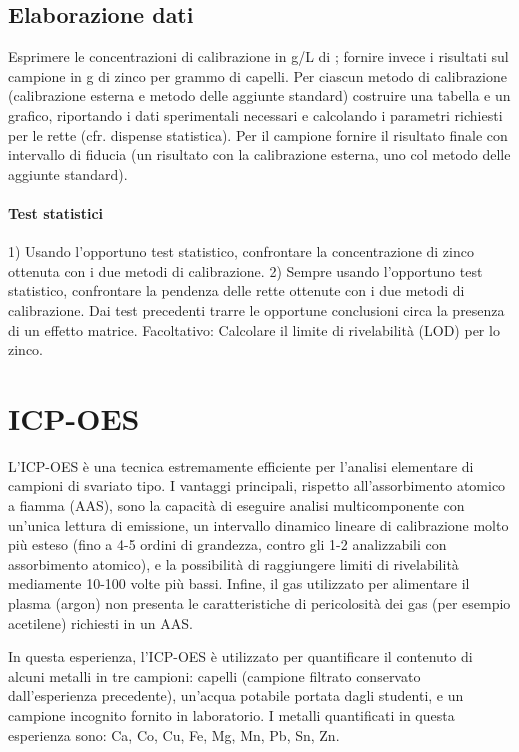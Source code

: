 \subsection{Elaborazione dati}
Esprimere le concentrazioni di calibrazione in \mu g/L di ; fornire invece i risultati sul campione in \mu g di zinco per grammo di capelli. Per ciascun metodo di calibrazione (calibrazione esterna e metodo delle aggiunte standard) costruire una tabella e un grafico, riportando i dati sperimentali necessari e calcolando i parametri richiesti per le rette (cfr. dispense statistica). Per il campione fornire il risultato finale con intervallo di fiducia (un risultato con la calibrazione esterna, uno col metodo delle aggiunte standard).

\paragraph{Test statistici}
1) Usando l'opportuno test statistico, confrontare la concentrazione di zinco ottenuta con i due metodi di calibrazione. 2) Sempre usando l'opportuno test statistico, confrontare la pendenza delle rette ottenute con i due metodi di calibrazione. Dai test precedenti trarre le opportune conclusioni circa la presenza di un effetto matrice.
Facoltativo: Calcolare il limite di rivelabilità (LOD) per lo zinco.

\section{ICP-OES}

L'ICP-OES è una tecnica estremamente efficiente per l'analisi elementare di campioni di svariato tipo. I vantaggi principali, rispetto all'assorbimento atomico a fiamma (AAS), sono la capacità di eseguire analisi multicomponente con un'unica lettura di emissione, un intervallo dinamico lineare di calibrazione molto più esteso (fino a 4-5 ordini di grandezza, contro gli 1-2 analizzabili con assorbimento atomico), e la possibilità di raggiungere limiti di rivelabilità mediamente 10-100 volte più bassi. Infine, il gas utilizzato per alimentare il plasma (argon) non presenta le caratteristiche di pericolosità dei gas (per esempio acetilene) richiesti in un AAS.

In questa esperienza, l'ICP-OES è utilizzato per quantificare il contenuto di alcuni metalli in tre campioni: capelli (campione filtrato conservato dall'esperienza precedente), un'acqua potabile portata dagli studenti, e un campione incognito fornito in laboratorio. I metalli quantificati in questa esperienza sono: Ca, Co, Cu, Fe, Mg, Mn, Pb, Sn, Zn. 

